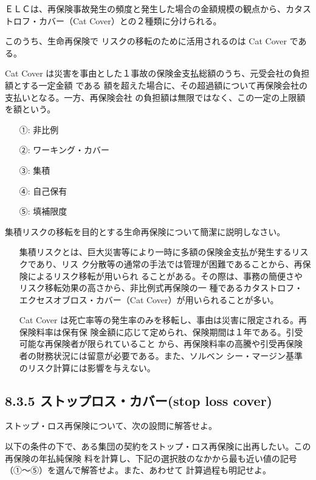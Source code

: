 \documentclass[report,gutter=10mm,fore-edge=10mm,uplatex,dvipdfmx]{jlreq}
\begin{document}
ＥＬＣは、再保険事故発生の頻度と発生した場合の金額規模の観点から、カタストロフ・カバー（Cat
Cover）との２種類に分けられる。

このうち、生命再保険で
リスクの移転のために活用されるのは Cat Cover である。

Cat Cover は災害を事由とした１事故の保険金支払総額のうち、元受会社の負担額とする一定金額
である
額を超えた場合に、その超過額について再保険会社の支払いとなる。一方、再保険会社
の負担額は無限ではなく、この一定の上限額を額という。

\answer{}
\begin{itemize}
\item[ ①: ]  非比例 
\item[ ②: ]  ワーキング・カバー 
\item[ ③: ]  集積 
\item[ ④: ]  自己保有 
\item[ ⑤: ]  填補限度
\end{itemize}

集積リスクの移転を目的とする生命再保険について簡潔に説明しなさい。
\answer{}
\begin{itemize}
\item[] 集積リスクとは、巨大災害等により一時に多額の保険金支払が発生するリスクであり、リス
 ク分散等の通常の手法では管理が困難であることから、再保険によるリスク移転が用いられ
 ることがある。その際は、事務の簡便さやリスク移転効果の高さから、非比例式再保険の一
 種であるカタストロフ・エクセスオブロス・カバー（Cat Cover）が用いられることが多い。
\item[] Cat Cover は死亡率等の発生率のみを移転し、事由は災害に限定される。再保険料率は保有保
 険金額に応じて定められ、保険期間は１年である。引受可能な再保険者が限られていること
 から、再保険料率の高騰や引受再保険者の財務状況には留意が必要である。また、ソルベン
 シー・マージン基準のリスク計算には影響を与えない。
\end{itemize}

\subsection{8.3.5 ストップロス・カバー(stop loss cover)}

ストップ・ロス再保険について、次の設問に解答せよ。

以下の条件の下で、ある集団の契約をストップ・ロス再保険に出再したい。この再保険の年払純保険
料を計算し、下記の選択肢のなかから最も近い値の記号（①～⑤）を選んで解答せよ。また、あわせて
計算過程も明記せよ。
\end{document}
